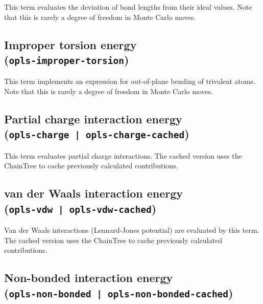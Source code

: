 This term evaluates the deviation of bond lengths from their ideal
values. Note that this is rarely a degree of freedom in Monte Carlo
moves.

\subsection{Improper torsion energy \\(\texttt{opls-improper-torsion})}

This term implements an expression for out-of-plane bending of
trivalent atoms. Note that this is rarely a degree of freedom in Monte
Carlo moves.

\subsection{Partial charge interaction energy \\(\texttt{opls-charge | opls-charge-cached})}

This term evaluates partial charge interactions. The cached version
uses the ChainTree to cache previously calculated contributions.

\begin{optiontable}
\end{optiontable}

\subsection{van der Waals interaction energy \\(\texttt{opls-vdw | opls-vdw-cached})}

Van der Waals interactions (Lennard-Jones potential) are evaluated by
this term. The cached version uses the ChainTree to cache previously
calculated contributions.

\begin{optiontable}
\end{optiontable}

\subsection{Non-bonded interaction energy \\(\texttt{opls-non-bonded | opls-non-bonded-cached})}
\label{sec:opls-non-bonded}

